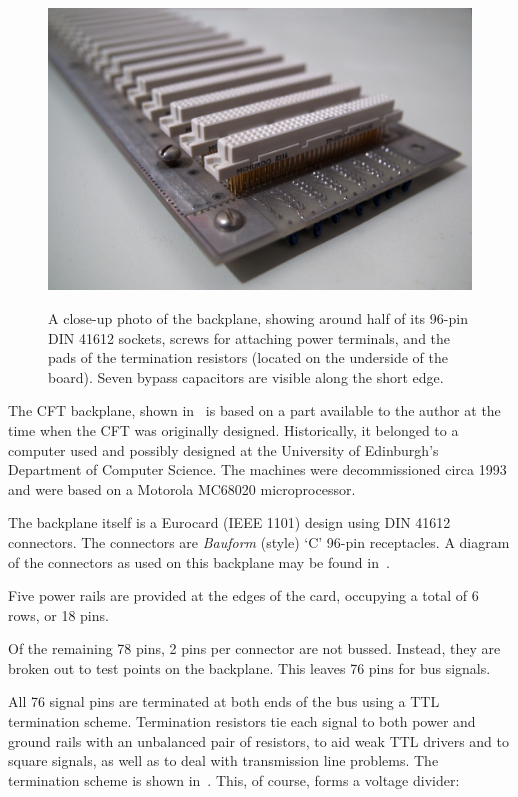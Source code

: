 \begin{figure}
\centering
\includegraphics[width=0.95\columnwidth]{figs/dsc_1996b.jpg}\\
\caption[A photo of the CFT backplane.]{\label{photo:backplane}A close-up photo
  of the backplane, showing around half of its 96-pin DIN 41612 sockets, screws
  for attaching power terminals, and the pads of the termination resistors
  (located on the underside of the board). Seven bypass capacitors are visible
  along the short edge.
}
\end{figure}


The CFT backplane, shown in~ is based on a part available
to the author at the time when the CFT was originally designed. Historically,
it belonged to a computer used and possibly designed at the University of
Edinburgh's Department of Computer Science. The machines were decommissioned
circa 1993 and were based on a Motorola MC68020 microprocessor.

The backplane itself is a Eurocard (IEEE 1101) design using DIN 41612
connectors. The connectors are {\em Bauform\/} (style) ‘C’ 96-pin
receptacles. A diagram of the connectors as used on this backplane may be found
in~.

Five power rails are provided at the edges of the card, occupying a total of 6
rows, or 18 pins.

Of the remaining 78 pins, 2 pins per connector are not bussed. Instead, they
are broken out to test points on the backplane. This leaves 76 pins for bus
signals.

All 76 signal pins are terminated at both ends of the bus using a TTL
termination scheme. Termination resistors tie each signal to both power and
ground rails with an unbalanced pair of resistors, to aid weak TTL drivers and
to square signals, as well as to deal with transmission line problems. The
termination scheme is shown in~. This, of course,
forms a voltage divider:


